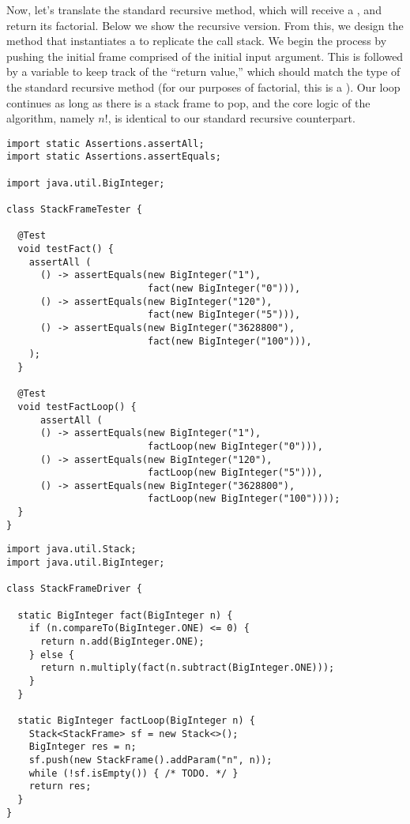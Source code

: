 Now, let's translate the standard recursive  method, which will receive a , and return its factorial. Below we show the recursive version. From this, we design the  method that instantiates a  to replicate the call stack. We begin the process by pushing the initial frame comprised of the initial input argument. This is followed by a variable to keep track of the ``return value,'' which should match the type of the standard recursive method (for our purposes of factorial, this is a ). Our loop continues as long as there is a stack frame to pop, and the core logic of the algorithm, namely $n!$, is identical to our standard recursive counterpart.

\begin{lstlisting}[language=MyJava]
import static Assertions.assertAll;
import static Assertions.assertEquals;

import java.util.BigInteger;

class StackFrameTester {

  @Test
  void testFact() {
    assertAll (
      () -> assertEquals(new BigInteger("1"), 
                         fact(new BigInteger("0"))),
      () -> assertEquals(new BigInteger("120"), 
                         fact(new BigInteger("5"))),
      () -> assertEquals(new BigInteger("3628800"), 
                         fact(new BigInteger("100"))),
    );
  }

  @Test
  void testFactLoop() {
      assertAll (
      () -> assertEquals(new BigInteger("1"), 
                         factLoop(new BigInteger("0"))),
      () -> assertEquals(new BigInteger("120"), 
                         factLoop(new BigInteger("5"))),
      () -> assertEquals(new BigInteger("3628800"), 
                         factLoop(new BigInteger("100"))));
  }
}  
\end{lstlisting}

\begin{lstlisting}[language=MyJava]
import java.util.Stack;
import java.util.BigInteger;

class StackFrameDriver {

  static BigInteger fact(BigInteger n) {
    if (n.compareTo(BigInteger.ONE) <= 0) {
      return n.add(BigInteger.ONE);
    } else {
      return n.multiply(fact(n.subtract(BigInteger.ONE)));
    }
  }

  static BigInteger factLoop(BigInteger n) {
    Stack<StackFrame> sf = new Stack<>();
    BigInteger res = n;
    sf.push(new StackFrame().addParam("n", n));
    while (!sf.isEmpty()) { /* TODO. */ }
    return res;
  }
}
\end{lstlisting}

